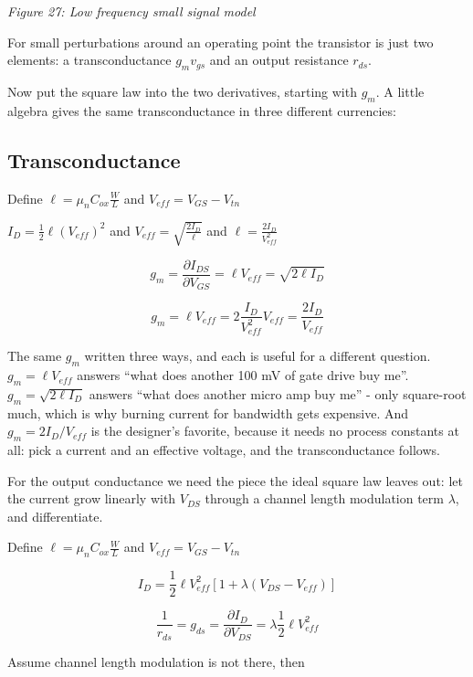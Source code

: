 {
\centering
{}
}

\emph{Figure 27: Low frequency small signal model}

For small perturbations around an operating point the transistor is just
two elements: a transconductance \(g_m v_{gs}\) and an output resistance
\(r_{ds}\).

Now put the square law into the two derivatives, starting with \(g_m\).
A little algebra gives the same transconductance in three different
currencies:

\subsection{Transconductance}\label{transconductance}

Define \(\ell = \mu_n C_{ox} \frac{W}{L}\) and
\(V_{eff} = V_{GS} - V_{tn}\)

\(I_{D} = \frac{1}{2} \ell (V_{eff})^2\) and
\(V_{eff} = \sqrt{\frac{2I_{D}}{\ell}}\) and
\(\ell = \frac{2I_D}{V_{eff}^2}\)

\[ g_m = \frac{ \partial I_{DS}} {\partial V_{GS}} = \ell V_{eff} = \sqrt{2 \ell I_{D}} \]

\[  g_m = \ell V_{eff} = 2 \frac{I_D}{V_{eff}^2} V_{eff} = \frac{2 I_D}{V_{eff}} \]

The same \(g_m\) written three ways, and each is useful for a different
question. \(g_m = \ell V_{eff}\) answers ``what does another 100 mV of
gate drive buy me''. \(g_m = \sqrt{2\ell I_D}\) answers ``what does
another micro amp buy me'' - only square-root much, which is why burning
current for bandwidth gets expensive. And \(g_m = 2I_D/V_{eff}\) is the
designer's favorite, because it needs no process constants at all: pick
a current and an effective voltage, and the transconductance follows.

For the output conductance we need the piece the ideal square law leaves
out: let the current grow linearly with \(V_{DS}\) through a channel
length modulation term \(\lambda\), and differentiate.

Define \(\ell = \mu_n C_{ox} \frac{W}{L}\) and
\(V_{eff} = V_{GS} - V_{tn}\)

\[ I_D = \frac{1}{2} \ell V_{eff}^2\left[1 + \lambda (V_{DS} - V_{eff})\right] \]

\[\frac{1}{r_{ds}} = g_{ds} = \frac{ \partial I_D}{\partial V_{DS} }  = \lambda \frac{1}{2} \ell V_{eff}^2\]

Assume channel length modulation is not there, then

